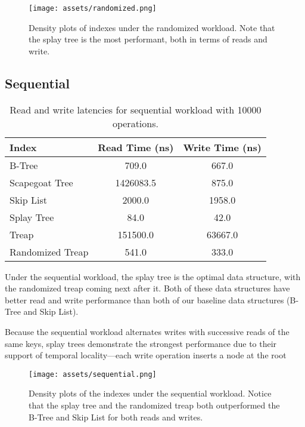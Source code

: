 \documentclass[sigconf]{acmart}
\begin{document}
\begin{center}
  \begin{figure}[H]
    \texttt{[image: assets/randomized.png]}
    \caption{Density plots of indexes under the randomized workload. Note that the splay tree is the most performant, both in terms of reads and write.}
  \end{figure}
\end{center}
\newpage

\subsection{Sequential}
\begin{center}
  \begin{table}[H]
    \begin{tabular}{|l|c|c|}
      \hline
      \bf{Index} & \bf{Read Time (ns)} & \bf{Write Time (ns)} \\
      \hline
      B-Tree&709.0&667.0\\
      \hline
      Scapegoat Tree&1426083.5&875.0\\
      \hline
      Skip List&2000.0&1958.0\\
      \hline
      Splay Tree&84.0&42.0\\
      \hline
      Treap&151500.0&63667.0\\
      \hline
      Randomized Treap&541.0&333.0\\
      \hline
    \end{tabular}
    \caption{Read and write latencies for sequential workload with 10000 operations.}
  \end{table}
\end{center}

Under the sequential workload, the splay tree is the optimal data structure, with the randomized treap coming next after it. Both of these data structures have better read and write performance than both of our baseline data structures (B-Tree and Skip List).

Because the sequential workload alternates writes with successive reads of the same keys, splay trees demonstrate the strongest performance due to their support of temporal locality---each write operation inserts a node at the root 

\begin{center}
  \begin{figure}[H]
    \texttt{[image: assets/sequential.png]}
    \caption{Density plots of the indexes under the sequential workload. Notice that the splay tree and the randomized treap both outperformed the B-Tree and Skip List for both reads and writes.}
  \end{figure}
\end{center}
\newpage
\end{document}
